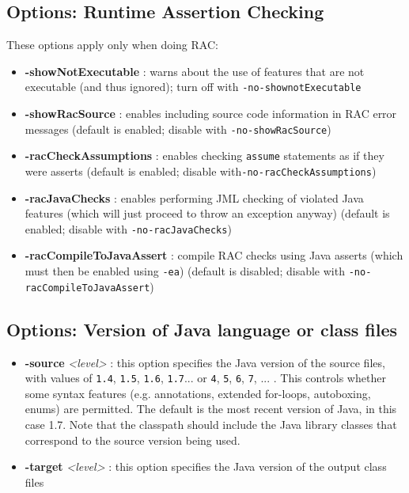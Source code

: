 \documentclass{report}%
\begin{document}
\subsection{Options: Runtime Assertion Checking}
\label{OptionsRAC}

These options apply only when doing RAC:
\begin{itemize}
\item \textbf{-showNotExecutable} : warns about the use of features that are not executable (and thus ignored); turn off with \texttt{-no-shownotExecutable}
\item \textbf{-showRacSource} : enables including source code information in RAC error messages (default is enabled; disable with \texttt{-no-showRacSource})
\item \textbf{-racCheckAssumptions} : enables checking \texttt{assume} statements as if they were asserts (default is enabled; disable with\texttt{-no-racCheckAssumptions})
\item \textbf{-racJavaChecks} : enables performing JML checking of violated Java features (which will just proceed to throw an exception anyway) (default is enabled; disable with \texttt{-no-racJavaChecks})
\item \textbf{-racCompileToJavaAssert} : compile RAC checks using Java asserts (which must then be enabled using \texttt{-ea}) (default is disabled; disable with \texttt{-no-racCompileToJavaAssert})
\end{itemize}

\subsection{Options: Version of Java language or class files}

\begin{itemize}
\item \textbf{-source} {\it <level>} : this option specifies the Java version of the source files, with values of {\tt 1.4}, {\tt 1.5}, {\tt 1.6}, {\tt 1.7}... or {\tt 4}, {\tt 5}, {\tt 6}, {\tt 7}, ... . This controls whether some syntax features  
(e.g. annotations, extended for-loops, autoboxing, enums) are permitted. The default is the most recent version
of Java, in this case 1.7.  Note that the classpath should include the Java library classes that
correspond to the source version being used.

\item \textbf{-target} {\it <level>} : this option specifies the Java version of the output class files
\end{itemize}
\end{document}
